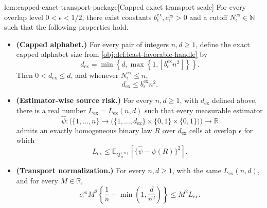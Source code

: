 \documentclass[11pt]{article}
\begin{document}
\begin{lemmav}{lem:capped-exact-transport-package}[Capped exact transport scale]
For every overlap level \(0<\epsilon<1/2\), there exist constants
\(b_{\epsilon}^{\mathrm{ex}},c_{\epsilon}^{\mathrm{ex}}>0\) and a cutoff
\(N_{\epsilon}^{\mathrm{ex}}\in\mathbb N\) such that the following properties hold.
\begin{itemize}
\item \textbf{(Capped alphabet.)} For every pair of integers \(n,d\ge1\), define the exact capped alphabet size from \cref{obj:def:least-favorable-handle} by
\[
d_{\mathrm{ex}}
=
\min\left\{d,\max\left\{1,\left\lfloor b_{\epsilon}^{\mathrm{ex}}n^2\right\rfloor\right\}\right\}.
\]
Then \(0<d_{\mathrm{ex}}\le d\), and whenever \(N_{\epsilon}^{\mathrm{ex}}\le n\),
\[
d_{\mathrm{ex}}\le b_{\epsilon}^{\mathrm{ex}}n^2 .
\]

\item \textbf{(Estimator-wise source risk.)} For every \(n,d\ge1\), with \(d_{\mathrm{ex}}\) defined above, there is a real number \(L_{\mathrm{ex}}=L_{\mathrm{ex}}(n,d)\) such that every measurable estimator
\[
\widehat\psi:\bigl(\{1,\ldots,n\}\to \bigl(\{1,\ldots,d_{\mathrm{ex}}\}\times\{0,1\}\times\{0,1\}\bigr)\bigr)\to\mathbb R
\]
admits an exactly homogeneous binary law \(R\) over \(d_{\mathrm{ex}}\) cells at overlap \(\epsilon\) for which
\[
L_{\mathrm{ex}}
\le
\mathbb E_{Q_R^{(n)}}\!\left[
\{\widehat\psi-\psi(R)\}^2
\right].
\]

\item \textbf{(Transport normalization.)} For every \(n,d\ge1\), with the same \(L_{\mathrm{ex}}(n,d)\), and for every \(M\in\mathbb R\),
\[
c_{\epsilon}^{\mathrm{ex}}M^2
\left\{\frac1n+\min\left(1,\frac d{n^2}\right)\right\}
\le
M^2L_{\mathrm{ex}} .
\]
\end{itemize}
\end{lemmav}
\end{document}
